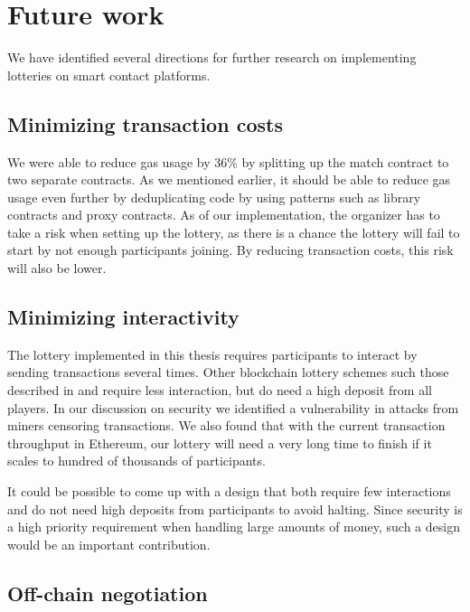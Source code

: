 \section{Future work}
\label{sec:future-work}

We have identified several directions for further research on implementing lotteries on smart contact platforms.

\subsection{Minimizing transaction costs}

We were able to reduce gas usage by 36\% by splitting up the match contract to two separate contracts. As we mentioned earlier, it should be able to reduce gas usage even further by deduplicating code by using patterns such as library contracts and proxy contracts. As of our implementation, the organizer has to take a risk when setting up the lottery, as there is a chance the lottery will fail to start by not enough participants joining. By reducing transaction costs, this risk will also be lower.

\subsection{Minimizing interactivity}

The lottery implemented in this thesis requires participants to interact by sending transactions several times. Other blockchain lottery schemes such those described in \cite{andrychowicz_secure_2014} and \cite{bentov_how_2014} require less interaction, but do need a high deposit from all players. In our discussion on security we identified a vulnerability in attacks from miners censoring transactions. We also found that with the current transaction throughput in Ethereum, our lottery will need a very long time to finish if it scales to hundred of thousands of participants. 

It could be possible to come up with a design that both require few interactions and do not need high deposits from participants to avoid halting. Since security is a high priority requirement when handling large amounts of money, such a design would be an important contribution.


\subsection{Off-chain negotiation}

